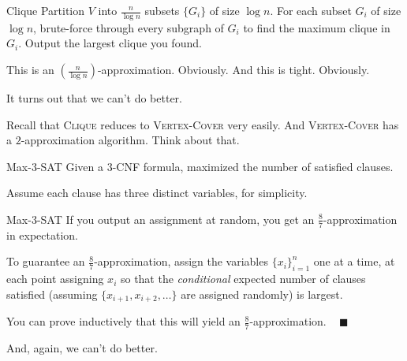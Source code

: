 \begin{solution}{Clique}
    Partition $V$ into $\frac{n}{\log n}$ subsets $\{G_i\}$ of size $\log n$.  For each subset $G_i$ of size $\log n$, brute-force through every subgraph of $G_i$ to find the maximum clique in $G_i$.  Output the largest clique you found.

    This is an $\left(\frac{n}{\log n}\right)$-approximation.  Obviously.  And this is tight.  Obviously.
\end{solution}

It turns out that we can't do better.

\begin{remark}
    Recall that \textsc{Clique} reduces to \textsc{Vertex-Cover} very easily.  And \textsc{Vertex-Cover} has a $2$-approximation algorithm.  Think about that.
\end{remark}

\begin{problem}{Max-3-SAT}
    Given a $3$-CNF formula, maximized the number of satisfied clauses.

    Assume each clause has three distinct variables, for simplicity.
\end{problem}

\begin{solution}{Max-3-SAT}
    If you output an assignment at random, you get an $\frac{8}{7}$-approximation in expectation.

    To guarantee an $\frac{8}{7}$-approximation, assign the variables $\{x_i\}_{i = 1}^n$ one at a time, at each point assigning $x_i$ so that the \emph{conditional} expected number of clauses satisfied (assuming $\{x_{i + 1}, x_{i + 2}, \dots\}$ are assigned randomly) is largest.

    You can prove inductively that this will yield an $\frac{8}{7}$-approximation. ~ $\blacksquare$
\end{solution}

And, again, we can't do better.

